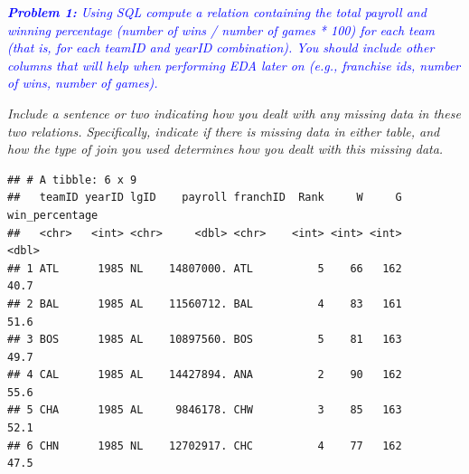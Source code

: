\documentclass[]{article}
\newenvironment{Shaded}{\begin{snugshade}}{\end{snugshade}}
\newcommand{\KeywordTok}[1]{\textcolor[rgb]{0.13,0.29,0.53}{\textbf{#1}}}
\newcommand{\CharTok}[1]{\textcolor[rgb]{0.31,0.60,0.02}{#1}}
\newcommand{\StringTok}[1]{\textcolor[rgb]{0.31,0.60,0.02}{#1}}
\newcommand{\CommentTok}[1]{\textcolor[rgb]{0.56,0.35,0.01}{\textit{#1}}}
\newcommand{\OperatorTok}[1]{\textcolor[rgb]{0.81,0.36,0.00}{\textbf{#1}}}
\newcommand{\NormalTok}[1]{#1}
\begin{document}
\textcolor{blue}\emph{\textbf{Problem 1:} Using SQL compute a relation
containing the total payroll and winning percentage (number of wins /
number of games * 100) for each team (that is, for each teamID and
yearID combination). You should include other columns that will help
when performing EDA later on (e.g., franchise ids, number of wins,
number of games).}

{ \emph{Include a sentence or two indicating how you dealt with any
missing data in these two relations. Specifically, indicate if there is
missing data in either table, and how the type of join you used
determines how you dealt with this missing data.} }

\begin{Shaded}
\end{Shaded}

\begin{verbatim}
## # A tibble: 6 x 9
##   teamID yearID lgID    payroll franchID  Rank     W     G win_percentage
##   <chr>   <int> <chr>     <dbl> <chr>    <int> <int> <int>          <dbl>
## 1 ATL      1985 NL    14807000. ATL          5    66   162           40.7
## 2 BAL      1985 AL    11560712. BAL          4    83   161           51.6
## 3 BOS      1985 AL    10897560. BOS          5    81   163           49.7
## 4 CAL      1985 AL    14427894. ANA          2    90   162           55.6
## 5 CHA      1985 AL     9846178. CHW          3    85   163           52.1
## 6 CHN      1985 NL    12702917. CHC          4    77   162           47.5
\end{verbatim}
\end{document}
